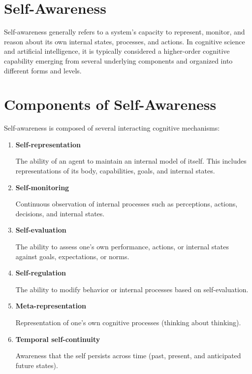 \documentclass{article}
\begin{document}
   \section{Self-Awareness}

      Self-awareness generally refers to a system's capacity to represent, monitor, and reason about its own internal states, processes, and actions. In cognitive science and artificial intelligence, it is typically considered a higher-order cognitive capability emerging from several underlying components and organized into different forms and levels.


   \section{Components of Self-Awareness}

      Self-awareness is composed of several interacting cognitive mechanisms:

      \begin{enumerate}[label=\arabic*.]
         \item \textbf{Self-representation}

         The ability of an agent to maintain an internal model of itself. This includes representations of its body, capabilities, goals, and internal states.

         \item \textbf{Self-monitoring}

         Continuous observation of internal processes such as perceptions, actions, decisions, and internal states.

         \item \textbf{Self-evaluation}

         The ability to assess one's own performance, actions, or internal states against goals, expectations, or norms.

         \item \textbf{Self-regulation}

         The ability to modify behavior or internal processes based on self-evaluation.

         \item \textbf{Meta-representation}

         Representation of one's own cognitive processes (thinking about thinking).

         \item \textbf{Temporal self-continuity}

         Awareness that the self persists across time (past, present, and anticipated future states).
      \end{enumerate}
\end{document}
